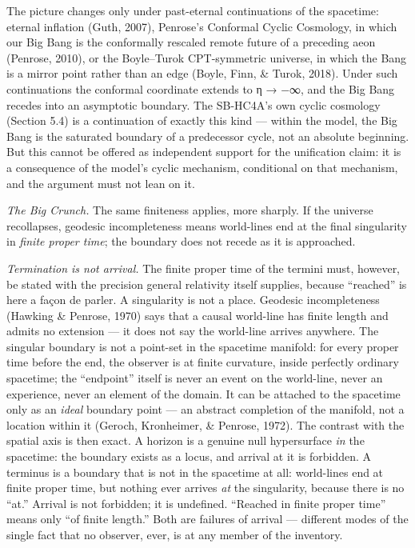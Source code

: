 \documentclass[
]{article}
\begin{document}
The picture changes only under past-eternal continuations of the
spacetime: eternal inflation (Guth, 2007), Penrose's Conformal Cyclic
Cosmology, in which our Big Bang is the conformally rescaled remote
future of a preceding aeon (Penrose, 2010), or the Boyle--Turok
CPT-symmetric universe, in which the Bang is a mirror point rather than
an edge (Boyle, Finn, \& Turok, 2018). Under such continuations the
conformal coordinate extends to η → −∞, and the Big Bang recedes into an
asymptotic boundary. The SB-HC4A's own cyclic cosmology (Section 5.4) is
a continuation of exactly this kind --- within the model, the Big Bang
is the saturated boundary of a predecessor cycle, not an absolute
beginning. But this cannot be offered as independent support for the
unification claim: it is a consequence of the model's cyclic mechanism,
conditional on that mechanism, and the argument must not lean on it.

\emph{The Big Crunch.} The same finiteness applies, more sharply. If the
universe recollapses, geodesic incompleteness means world-lines end at
the final singularity in \emph{finite proper time}; the boundary does
not recede as it is approached.

\emph{Termination is not arrival.} The finite proper time of the termini
must, however, be stated with the precision general relativity itself
supplies, because ``reached'' is here a façon de parler. A singularity
is not a place. Geodesic incompleteness (Hawking \& Penrose, 1970) says
that a causal world-line has finite length and admits no extension ---
it does not say the world-line arrives anywhere. The singular boundary
is not a point-set in the spacetime manifold: for every proper time
before the end, the observer is at finite curvature, inside perfectly
ordinary spacetime; the ``endpoint'' itself is never an event on the
world-line, never an experience, never an element of the domain. It can
be attached to the spacetime only as an \emph{ideal} boundary point ---
an abstract completion of the manifold, not a location within it
(Geroch, Kronheimer, \& Penrose, 1972). The contrast with the spatial
axis is then exact. A horizon is a genuine null hypersurface \emph{in}
the spacetime: the boundary exists as a locus, and arrival at it is
forbidden. A terminus is a boundary that is not in the spacetime at all:
world-lines end at finite proper time, but nothing ever arrives
\emph{at} the singularity, because there is no ``at.'' Arrival is not
forbidden; it is undefined. ``Reached in finite proper time'' means only
``of finite length.'' Both are failures of arrival --- different modes
of the single fact that no observer, ever, is at any member of the
inventory.
\end{document}
